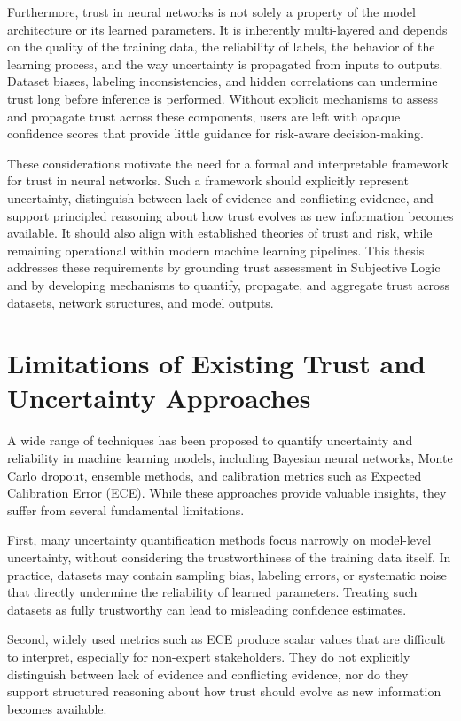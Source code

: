 Furthermore, trust in neural networks is not solely a property of the model architecture or its learned parameters. It is inherently multi-layered and depends on the quality of the training data, the reliability of labels, the behavior of the learning process, and the way uncertainty is propagated from inputs to outputs. Dataset biases, labeling inconsistencies, and hidden correlations can undermine trust long before inference is performed. Without explicit mechanisms to assess and propagate trust across these components, users are left with opaque confidence scores that provide little guidance for risk-aware decision-making.

These considerations motivate the need for a formal and interpretable framework for trust in neural networks. Such a framework should explicitly represent uncertainty, distinguish between lack of evidence and conflicting evidence, and support principled reasoning about how trust evolves as new information becomes available. It should also align with established theories of trust and risk, while remaining operational within modern machine learning pipelines. This thesis addresses these requirements by grounding trust assessment in Subjective Logic and by developing mechanisms to quantify, propagate, and aggregate trust across datasets, network structures, and model outputs.




\section{Limitations of Existing Trust and Uncertainty Approaches}
\label{sec:limitations}

A wide range of techniques has been proposed to quantify uncertainty and reliability in machine learning models, including Bayesian neural networks, Monte Carlo dropout, ensemble methods, and calibration metrics such as Expected Calibration Error (ECE). While these approaches provide valuable insights, they suffer from several fundamental limitations.

First, many uncertainty quantification methods focus narrowly on model-level uncertainty, without considering the trustworthiness of the training data itself. In practice, datasets may contain sampling bias, labeling errors, or systematic noise that directly undermine the reliability of learned parameters. Treating such datasets as fully trustworthy can lead to misleading confidence estimates.

Second, widely used metrics such as ECE produce scalar values that are difficult to interpret, especially for non-expert stakeholders. They do not explicitly distinguish between lack of evidence and conflicting evidence, nor do they support structured reasoning about how trust should evolve as new information becomes available.

